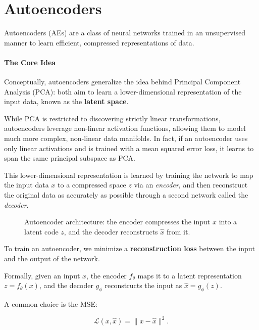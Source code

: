 \section{Autoencoders}
Autoencoders (AEs) are a class of neural networks trained in an unsupervised manner to learn efficient, compressed representations of data. 

\paragraph{The Core Idea}
Conceptually, autoencoders generalize the idea behind Principal Component Analysis (PCA): both aim to learn a lower-dimensional representation of the input data, known as the \textbf{latent space}.

While PCA is restricted to discovering strictly linear transformations, autoencoders leverage non-linear activation functions, allowing them to model much more complex, non-linear data manifolds. In fact, if an autoencoder uses only linear activations and is trained with a mean squared error loss, it learns to span the same principal subspace as PCA.

This lower-dimensional representation is learned by training the network to map the input data $x$ to a compressed space $z$ via an \textit{encoder}, and then reconstruct the original data as accurately as possible through a second network called the \textit{decoder}.

\begin{figure}[H]
    \centering
    \resizebox{0.6\textwidth}{!}{}
    \caption{Autoencoder architecture: the encoder compresses the input $x$ into a latent code $z$, and the decoder reconstructs $\hat{x}$ from it.}
    \label{fig:autoencoder-architecture}
\end{figure}

To train an autoencoder, we minimize a \textbf{reconstruction loss} between the input and the output of the network.

Formally, given an input $x$, the encoder $f_\theta$ maps it to a latent representation $z = f_\theta(x)$, and the decoder $g_\phi$ reconstructs the input as $\hat{x} = g_\phi(z)$.

A common choice is the MSE:

\begin{equation}
    \mathcal{L}(x,\hat{x}) = \|x-\hat{x}\|^2.
\end{equation}

